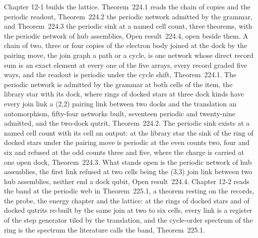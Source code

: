 Chapter 12-1 builds the lattice. Theorem~224.1 reads the chain of copies and the periodic readout, Theorem~224.2 the periodic network admitted by the grammar, and Theorem~224.3 the periodic sink at a named cell count, three theorems, with the periodic network of hub assemblies, Open result~224.4, open beside them. A chain of two, three or four copies of the electron body joined at the dock by the pairing move, the join graph a path or a cycle, is one network whose direct record sum is an exact element at every one of the five arrays, every record graded five ways, and the readout is periodic under the cycle shift, Theorem~224.1. The periodic network is admitted by the grammar at both cells of the item, the library star with its dock, where rings of docked stars at three dock kinds have every join link a (2,2) pairing link between two docks and the translation an automorphism, fifty-four networks built, seventeen periodic and twenty-nine admitted, and the two-dock qutrit, Theorem~224.2. The periodic sink exists at a named cell count with its cell an output: at the library star the sink of the ring of docked stars under the pairing move is periodic at the even counts two, four and six and refused at the odd counts three and five, where the charge is carried at one open dock, Theorem~224.3. What stands open is the periodic network of hub assemblies, the first link refused at two cells being the (3,3) join link between two hub assemblies, neither end a dock qubit, Open result~224.4. Chapter 12-2 reads the band at the periodic web in Theorem~225.1, a theorem resting on the records, the probe, the energy chapter and the lattice: at the rings of docked stars and of docked qutrits re-built by the same join at two to six cells, every link is a register of the step generator tiled by the translation, and the cycle-order spectrum of the ring is the spectrum the literature calls the band, Theorem~225.1.

